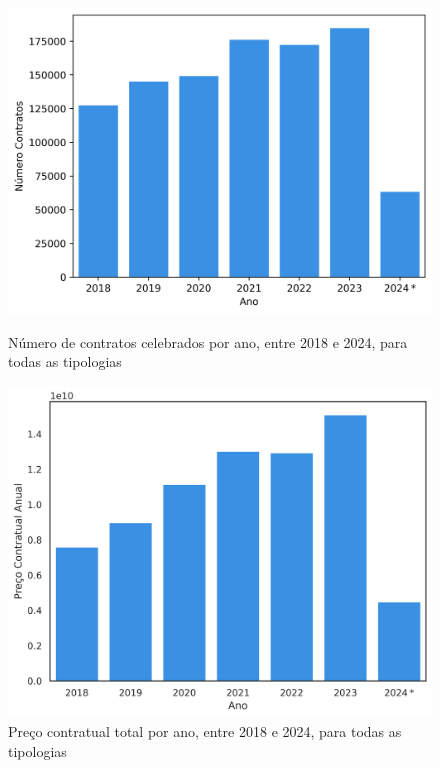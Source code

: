 \begin{figure}[H]
	\centering
	\begin{minipage}{.49\linewidth}
		\includegraphics[width=\linewidth]{imagens/contratos_ano.png}
		\caption{Número de contratos celebrados por ano, entre 2018 e 2024, para todas as tipologias}
		\label{fig:numcontrs}
	\end{minipage}
	\hfill
	\begin{minipage}{.49\linewidth}
		\includegraphics[width=\linewidth]{imagens/precocontr_ano.png}
		\caption{Preço contratual total por ano, entre 2018 e 2024, para todas as tipologias}
		\label{fig:precoscontrs}
	\end{minipage}
\end{figure}


